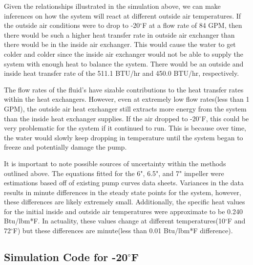 \documentclass{article}
\begin{document}
Given the relationships illustrated in the simulation above, we can make inferences on how the system will react at different outside air temperatures. If the outside air conditions were to drop to -20$^{\circ}$F at a flow rate of 84 GPM, then there would be such a higher heat transfer rate in outside air exchanger than there would be in the inside air exchanger. This would cause the water to get colder and colder since the inside air exchanger would not be able to supply the system with enough heat to balance the system. There would be an outside and inside heat transfer rate of the 511.1 BTU/hr and 450.0 BTU/hr, respectively. 

The flow rates of the fluid's have sizable contributions to the heat transfer rates within the heat exchangers. However, even at extremely low flow rates(less than 1 GPM), the outside air heat exchanger still extracts more energy from the system than the inside heat exchanger supplies. If the air dropped to -20$^{\circ}$F, this could be very problematic for the system if it continued to run. This is because over time, the water would slowly keep dropping in temperature until the system began to freeze and potentially damage the pump.

It is important to note possible sources of uncertainty within the methods outlined above. The equations fitted for the 6", 6.5", and 7" impeller were estimations based off of existing pump curves data sheets. Variances in the data results in minute differences in the steady state points for the system, however, these differences are likely extremely small. Additionally, the specific heat values for the initial inside and outside air temperatures were approximate to be 0.240 Btu/lbm*F. In actuality, these values change at different temperatures(10$^{\circ}$F and 72$^{\circ}$F) but these differences are minute(less than 0.01 Btu/lbm*F difference).
\subsection{Simulation Code for -20$^{\circ}$F}
\end{document}

